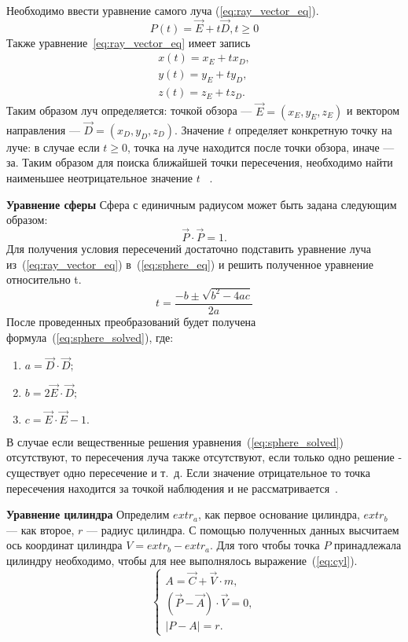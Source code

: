 Необходимо ввести уравнение самого луча (\ref{eq:ray_vector_eq}).
\begin{equation} 
	P(t) = \vec{E} +t\vec{D},t \ge 0
	\label{eq:ray_vector_eq}
\end{equation}
Также уравнение~\ref{eq:ray_vector_eq} имеет запись
\begin{equation}
	\label{eq:ray_scalar_eq}
	\begin{aligned}
		x(t) = x_E + t x_D, \\
		y(t) = y_E + t y_D, \\
		z(t) = z_E + t z_D.
	\end{aligned}
\end{equation}
Таким образом луч определяется: точкой обзора --- $\vec{E} = (x_E,y_E,z_E)$ и вектором направления --- $\vec{D} = (x_D,y_D,z_D)$. Значение $t$  определяет конкретную точку на луче: в случае если $t \ge 0$,
точка на луче находится после точки обзора, иначе --- за. Таким образом для поиска ближайшей точки пересечения, необходимо найти наименьшее неотрицательное значение $t$~\cite{Rodgers,primitives_raytracing_equations} .


\textbf{Уравнение сферы}
Сфера с единичным радиусом может быть задана следующим образом:
\begin{equation}
	\vec{P} \cdot \vec{P}=1.
	\label{eq:sphere_eq}
\end{equation}
Для получения условия пересечений достаточно подставить уравнение луча из~(\ref{eq:ray_vector_eq}) в~(\ref{eq:sphere_eq}) и решить полученное уравнение относительно t.
\begin{equation}
	t=\frac{-b\pm\sqrt{b^2-4ac}}{2a}
	\label{eq:sphere_solved}
\end{equation}
После проведенных преобразований будет получена формула~(\ref{eq:sphere_solved}), где:
\begin{enumerate}
	\item $a = \vec{D} \cdot \vec{D};$
	\item $b = 2\vec{E} \cdot \vec{D};$ 
	\item $c = \vec{E} \cdot \vec{E} - 1.$
\end{enumerate}
В случае если вещественные решения уравнения~(\ref{eq:sphere_solved}) отсутствуют, то пересечения луча также отсутствуют, если только одно решение  - существует одно
пересечение и т.~д. Если значение отрицательное то точка пересечения находится за точкой наблюдения и не рассматривается~\cite{primitives_raytracing_equations}.

\textbf{Уравнение цилиндра}
Определим $extr_a$, как первое основание цилиндра, $extr_b$ --- как второе,
$r$ --- радиус цилиндра. С помощью полученных данных высчитаем ось координат цилиндра $V = extr_b - extr_a$.
Для того чтобы точка $P$ принадлежала цилиндру необходимо, чтобы для нее выполнялось выражение~(\ref{eq:cyl}).
\begin{equation}
	\begin{cases}
	A = \vec{C} + \vec{V} \cdot m, \\
	(\vec{P} - \vec{A}) \cdot \vec{V} = 0, \\
	|P-A| = r. 
	\end{cases}
	\label{eq:cyl}
\end{equation}

